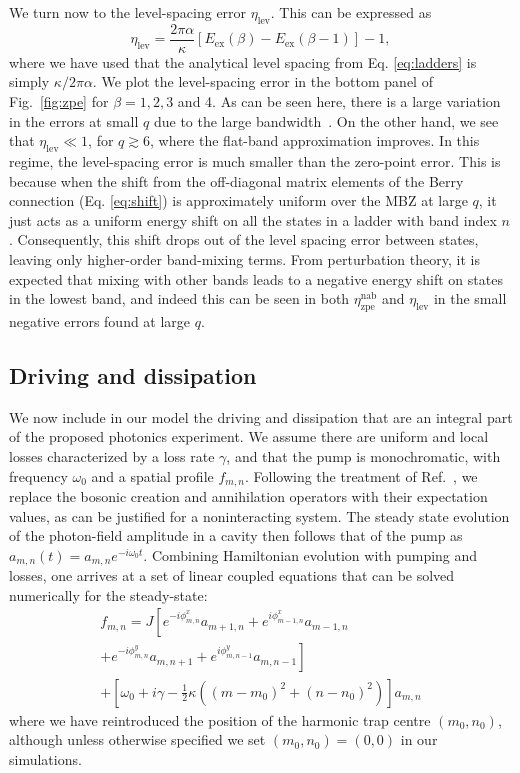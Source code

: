 We turn now to the level-spacing error $\eta_{\text{lev}}$. This can be expressed as 
\begin{equation}
\eta_{\text{lev}} = \frac{2\pi \alpha}{\kappa} [E_{\text{ex}}(\beta)
- E_{\text{ex}}(\beta - 1)] -1, 
\end{equation}
where we have used that the analytical level spacing from Eq. \ref{eq:ladders} is simply $\kappa / 2\pi \alpha$. 
We plot the level-spacing error in the bottom panel of Fig.~\ref{fig:zpe} for $\beta = 1, 2, 3$ and 4. As can be seen here, there is a large variation in the errors at small $q$ due to the large bandwidth~\cite{ozawa2014momhh}. On the other hand, we see that $\eta_{\text{lev}} \ll 1$, for $q \gtrsim 6$, where the flat-band approximation improves. In this regime, the level-spacing error is much smaller than the zero-point error. This is because when the shift from the off-diagonal matrix elements of the Berry connection (Eq. \ref{eq:shift}) is approximately uniform over the MBZ at large $q$, it just acts as a uniform energy shift on all the states in a  ladder with band index $n$. Consequently, this shift drops out of the level spacing error between states, leaving only higher-order band-mixing terms. From perturbation theory, it is expected that mixing with other bands leads to a negative energy shift on states in the lowest band, and indeed this can be seen in both $\eta_{\text{zpe}}^{\text{nab}}$ and $\eta_{\text{lev}}$ in the small negative errors found at large $q$. 

\subsection{Driving and dissipation}\label{sec:driven-dissipation}

We now include in our model the driving and dissipation that are an integral part of the proposed photonics experiment. We assume there are uniform and local losses
characterized by a loss rate $\gamma$, and that the pump is
monochromatic, with frequency $\omega_0$ and a spatial profile
$f_{m,n}$. Following the treatment of Ref.~\cite{ozawa2014qhe}, we replace the bosonic creation and annihilation operators with their expectation
values, as can be justified for a noninteracting system. The steady state evolution of the photon-field amplitude in a cavity then follows that of
the pump as $a_{m,n}(t) = a_{m,n} e^{-i \omega_0 t}$. Combining Hamiltonian evolution with pumping and losses, one arrives at a set of linear coupled equations that can be solved numerically for the steady-state\cite{cohen1992atom}:
%
\begin{multline}\label{eq:linear_problem}
f_{m,n} =J\left[e^{-i\phi_{m,n}^x}a_{m+1,n}+e^{i\phi_{m-1,n}^x}a_{m-1,n} \right. \\ 
\left. +e^{-i\phi_{m,n}^y}a_{m,n+1}+e^{i\phi_{m,n-1}^y}a_{m,n-1}\right] \\
+\left[\omega_{0}+i\gamma-\frac{1}{2}\kappa \left((m-m_0)^{2}+(n-n_0)^{2}\right)\right]a_{m,n}
\end{multline}
where we have reintroduced the position of the harmonic trap centre $(m_0, n_0)$, although unless otherwise specified we set $(m_0, n_0)=(0,0)$ in our simulations.

